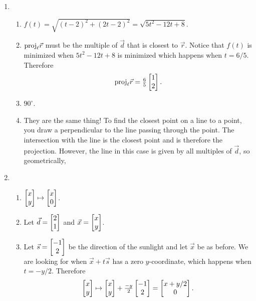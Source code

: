 \begin{enumerate}
\begin{enumerate}
\end{enumerate}

	\item \begin{enumerate}
			\item $f(t) = \sqrt{(t-2)^2+(2t-2)^2} = \sqrt{5t^2-12t+8}$.
			\item $\mathrm{proj}_\ell \vec r$ must be the multiple of $\vec d$ that is
				closest to $\vec r$. Notice that $f(t)$ is minimized when
				$5t^2-12t+8$ is minimized which happens when $t=6/5$. Therefore
				\[
					\mathrm{proj}_\ell \vec r = \tfrac{6}{5}\begin{bmatrix}1\\2\end{bmatrix}.
				\]
			\item $90^\circ$.
			\item They are the same thing! To find the closest point on a line
				to a point, you draw a perpendicular to the line passing through the point.
				The intersection with the line is the closest point and is therefore the projection.
				However, the line in this case is given by
				all multiples of $\vec d$, so geometrically,
	\end{enumerate}
		\item  \begin{enumerate}
				\item $\begin{bmatrix}x\\y\end{bmatrix}\mapsto \begin{bmatrix}x\\0\end{bmatrix}$.
			\item Let $\vec d=\begin{bmatrix}2\\1\end{bmatrix}$ and $\vec x=\begin{bmatrix}x\\y\end{bmatrix}$.
			\item Let $\vec s=\begin{bmatrix}-1\\2\end{bmatrix}$ be the direction of the sunlight and let $\vec x$ be as before.
				We are looking for when $\vec x+t\vec s$ has a zero $y$-coordinate, which happens when
				$t=-y/2$. Therefore
				\[
					\begin{bmatrix}x\\y\end{bmatrix}\mapsto \begin{bmatrix}x\\y\end{bmatrix}+\tfrac{-y}{2}\begin{bmatrix}-1\\2\end{bmatrix} = \begin{bmatrix}x+y/2\\0\end{bmatrix}.
				\]
		\end{enumerate}

		\end{enumerate}
	
